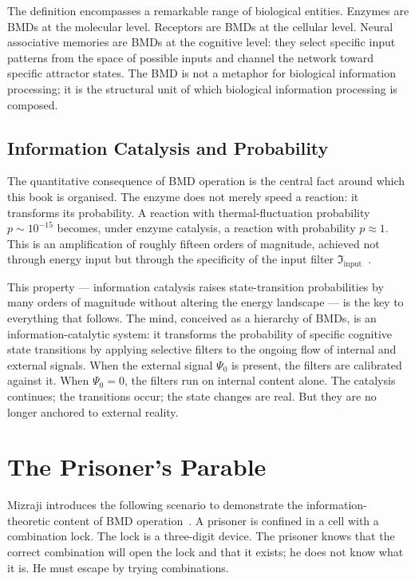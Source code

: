 The definition encompasses a remarkable range of biological entities. Enzymes are BMDs at the molecular level. Receptors are BMDs at the cellular level. Neural associative memories are BMDs at the cognitive level: they select specific input patterns from the space of possible inputs and channel the network toward specific attractor states. The BMD is not a metaphor for biological information processing; it is the structural unit of which biological information processing is composed.

\subsection{Information Catalysis and Probability}

The quantitative consequence of BMD operation is the central fact around which this book is organised. The enzyme does not merely speed a reaction: it transforms its probability. A reaction with thermal-fluctuation probability $p \sim 10^{-15}$ becomes, under enzyme catalysis, a reaction with probability $p \approx 1$. This is an amplification of roughly fifteen orders of magnitude, achieved not through energy input but through the specificity of the input filter $\mathfrak{I}_{\mathrm{input}}$~\cite{mizraji2021}.

This property --- information catalysis raises state-transition probabilities by many orders of magnitude without altering the energy landscape --- is the key to everything that follows. The mind, conceived as a hierarchy of BMDs, is an information-catalytic system: it transforms the probability of specific cognitive state transitions by applying selective filters to the ongoing flow of internal and external signals. When the external signal $\Psi_0$ is present, the filters are calibrated against it. When $\Psi_0 = 0$, the filters run on internal content alone. The catalysis continues; the transitions occur; the state changes are real. But they are no longer anchored to external reality.

\bigskip

\section{The Prisoner's Parable}

Mizraji introduces the following scenario to demonstrate the information-theoretic content of BMD operation~\cite{mizraji2021}. A prisoner is confined in a cell with a combination lock. The lock is a three-digit device. The prisoner knows that the correct combination will open the lock and that it exists; he does not know what it is. He must escape by trying combinations.

